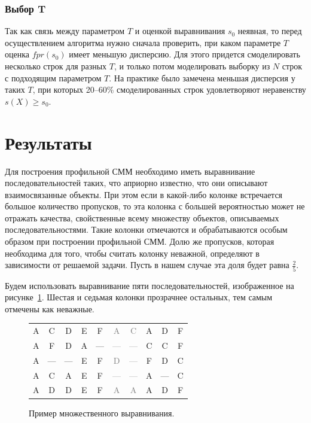 \documentclass[specialist,
substylefile = spbu_report.rtx,
subf,href,colorlinks=true, 12pt]{disser}
\begin{document}
			\subsubsection{Выбор T}
				Так как связь между параметром $T$ и оценкой выравнивания $s_{0}$ неявная, то перед осуществлением алгоритма нужно сначала проверить, при каком параметре $T$ оценка $fpr(s_{0})$ имеет меньшую дисперсию. Для этого придется смоделировать несколько строк для разных $T$, и только потом моделировать выборку из $N$ строк с подходящим параметром $T$. На практике было замечена меньшая дисперсия у таких $T$, при которых 20--60$\%$ смоделированных строк удовлетворяют неравенству $s(X) \geq s_{0}$.
		\section{Результаты}						
			Для построения профильной СММ необходимо иметь выравнивание последовательностей таких, что априорно известно, что они описывают взаимосвязанные объекты. При этом если в какой-либо колонке встречается большое количество пропусков, то эта колонка с большей вероятностью может не отражать качества, свойственные всему множеству объектов, описываемых последовательностями. Такие колонки отмечаются и обрабатываются особым образом при построении профильной СММ. Долю же пропусков, которая необходима для того, чтобы считать колонку неважной, определяют в зависимости от решаемой задачи. Пусть в нашем случае эта доля будет равна $\frac{2}{5}$.
			
			Будем использовать выравнивание пяти последовательностей, изображенное на рисунке~\ref{fg:4}. Шестая и седьмая колонки прозрачнее остальных, тем самым отмечены как неважные.		
			\begin{figure}
				\centering
				\begin{tabular}{cccccccccc}
					A&C&D&E&F&\textcolor{gray}{A}&\textcolor{gray}{C}&A&D&F\\
					A&F&D&A&—&\textcolor{gray}{—}&\textcolor{gray}{—}&C&C&F\\
					A&—&—&E&F&\textcolor{gray}{D}&\textcolor{gray}{—}&F&D&C\\
					A&C&A&E&F&\textcolor{gray}{—}&\textcolor{gray}{—}&A&—&C\\
					A&D&D&E&F&\textcolor{gray}{A}&\textcolor{gray}{A}&A&D&F
				\end{tabular}
				\caption{Пример множественного выравнивания.} \label{fg:4}
			\end{figure}					
			
\end{document}
